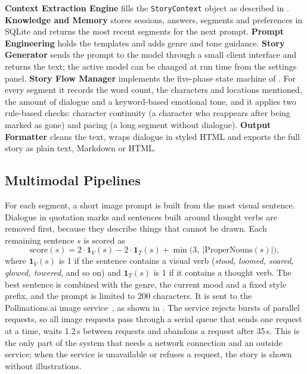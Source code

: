 \textbf{Context Extraction Engine} fills the \texttt{StoryContext} object as described in . \textbf{Knowledge and Memory} stores sessions, answers, segments and preferences in SQLite and returns the most recent segments for the next prompt. \textbf{Prompt Engineering} holds the templates and adds genre and tone guidance. \textbf{Story Generator} sends the prompt to the model through a small client interface and returns the text; the active model can be changed at run time from the settings panel. \textbf{Story Flow Manager} implements the five-phase state machine of . For every segment it records the word count, the characters and locations mentioned, the amount of dialogue and a keyword-based emotional tone, and it applies two rule-based checks: character continuity (a character who reappears after being marked as gone) and pacing (a long segment without dialogue). \textbf{Output Formatter} cleans the text, wraps dialogue in styled HTML and exports the full story as plain text, Markdown or HTML.

\subsection{Multimodal Pipelines}
\label{sec:model-multimodal}

For each segment, a short image prompt is built from the most visual sentence. Dialogue in quotation marks and sentences built around thought verbs are removed first, because they describe things that cannot be drawn. Each remaining sentence $s$ is scored as
\begin{equation}
\mathrm{score}(s) = 2 \cdot \mathbf{1}_{V}(s) - 2 \cdot \mathbf{1}_{T}(s) + \min\bigl(3,\ |\mathrm{ProperNouns}(s)|\bigr),
\label{eq:score}
\end{equation}
where $\mathbf{1}_V(s)$ is 1 if the sentence contains a visual verb (\emph{stood, loomed, soared, glowed, towered}, and so on) and $\mathbf{1}_T(s)$ is 1 if it contains a thought verb. The best sentence is combined with the genre, the current mood and a fixed style prefix, and the prompt is limited to 200 characters. It is sent to the Pollinations.ai image service~\cite{pollinations2024api}, as shown in . The service rejects bursts of parallel requests, so all image requests pass through a serial queue that sends one request at a time, waits 1.2\,s between requests and abandons a request after 35\,s. This is the only part of the system that needs a network connection and an outside service; when the service is unavailable or refuses a request, the story is shown without illustrations.

